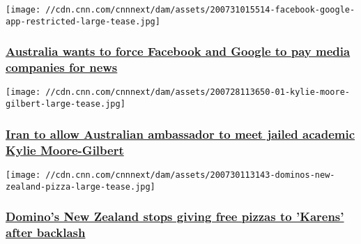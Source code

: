 \texttt{[image: //cdn.cnn.com/cnnnext/dam/assets/200731015514-facebook-google-app-restricted-large-tease.jpg]}

\hypertarget{australia-wants-to-force-facebook-and-google-to-pay-media-companies-for-news}{%
\subsubsection{\texorpdfstring{\href{/2020/07/31/media/facebook-google-australia-media-intl-hnk/index.html}{Australia
wants to force Facebook and Google to pay media companies for
news}}{Australia wants to force Facebook and Google to pay media companies for news}}\label{australia-wants-to-force-facebook-and-google-to-pay-media-companies-for-news}}

\href{/2020/07/31/middleeast/kylie-moore-gilbert-australian-ambassador-intl-hnk/index.html}{}

\texttt{[image: //cdn.cnn.com/cnnnext/dam/assets/200728113650-01-kylie-moore-gilbert-large-tease.jpg]}

\hypertarget{iran-to-allow-australian-ambassador-to-meet-jailed-academic-kylie-moore-gilbert}{%
\subsubsection{\texorpdfstring{\href{/2020/07/31/middleeast/kylie-moore-gilbert-australian-ambassador-intl-hnk/index.html}{Iran
to allow Australian ambassador to meet jailed academic Kylie
Moore-Gilbert}}{Iran to allow Australian ambassador to meet jailed academic Kylie Moore-Gilbert}}\label{iran-to-allow-australian-ambassador-to-meet-jailed-academic-kylie-moore-gilbert}}

\href{/2020/07/30/business/dominos-new-zealand-karen-offer-scli-intl/index.html}{}

\texttt{[image: //cdn.cnn.com/cnnnext/dam/assets/200730113143-dominos-new-zealand-pizza-large-tease.jpg]}

\hypertarget{dominos-new-zealand-stops-giving-free-pizzas-to-karens-after-backlash}{%
\subsubsection{\texorpdfstring{\href{/2020/07/30/business/dominos-new-zealand-karen-offer-scli-intl/index.html}{Domino's
New Zealand stops giving free pizzas to 'Karens' after
backlash}}{Domino's New Zealand stops giving free pizzas to 'Karens' after backlash}}\label{dominos-new-zealand-stops-giving-free-pizzas-to-karens-after-backlash}}

